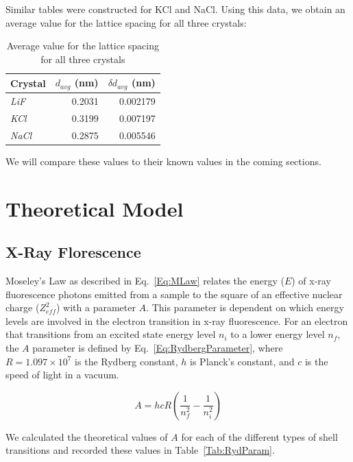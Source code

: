 \documentclass[%
 reprint,
 amsmath,amssymb,
 aps,
 pra,
]{revtex4-1}
\begin{document}
\noindent Similar tables were constructed for KCl and NaCl. Using this data, we obtain an average value for the lattice spacing for all three crystals:

\begin{table}[htbp]
	\begin{center}
	\begin{tabular}{|l|r|r|}
		\hline
		Crystal & \multicolumn{1}{l|}{$d_{avg}$ (nm)} & \multicolumn{1}{l|}{$\delta d_{avg}$ (nm)} \\ \hline
		\textit{LiF} & 0.2031 & 0.002179 \\ \hline
		\textit{KCl} & 0.3199 & 0.007197 \\ \hline
		\textit{NaCl} & 0.2875 & 0.005546 \\ \hline
	\end{tabular}
	\end{center}
	\caption{Average value for the lattice spacing for all three crystals}
	\label{table:d_average}
\end{table}

\noindent We will compare these values to their known values in the coming sections.

\section{Theoretical Model}

\subsection{X-Ray Florescence}

Moseley's Law as described in Eq.~\ref{Eq:MLaw} relates the energy ($E$) of x-ray fluorescence photons emitted from a sample to the square of an effective nuclear charge ($Z_{eff}^{2}$) with a parameter $A$. This parameter is dependent on which energy levels are involved in the electron transition in x-ray fluorescence. For an electron that transitions from an excited state energy level $n_{i}$ to a lower energy level $n_{f}$, the $A$ parameter is defined by Eq.~\ref{Eq:RydbergParameter}, where $R = 1.097 \times 10^7$ is the Rydberg constant, $h$ is Planck's constant, and $c$ is the speed of light in a vacuum.

\begin{equation}\label{Eq:RydbergParameter}
A = hcR(\frac{1}{n_{f}^{2}} - \frac{1}{n_{i}^{2}})
\end{equation}

We calculated the theoretical values of $A$ for each of the different types of shell transitions and recorded these values in Table~\ref{Tab:RydParam}.
\end{document}
